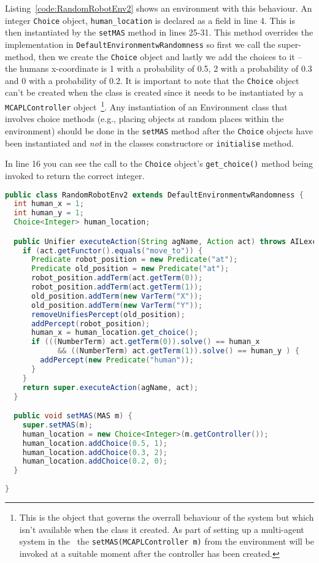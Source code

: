 \documentclass[a4]{article}
\begin{document}
Listing~\ref{code:RandomRobotEnv2} shows an environment with this behaviour.  An integer \texttt{Choice} object, \texttt{human\_location} is declared as a field in line 4.  This is then instantiated by the \texttt{setMAS} method in lines 25-31.  This method overrides the implementation in \texttt{DefaultEnvironmentwRandomness} so first we call the super-method, then we create the \texttt{Choice} object and lastly we add the choices to it -- the humans x-coordinate is 1 with a probability of 0.5, 2 with a probability of 0.3 and 0 with a probability of 0.2.  It is important to note that the \texttt{Choice} object can't be created when the class is created since it needs to be instantiated by a \texttt{MCAPLController} object~\footnote{This is the object that governs the overrall behaviour of the system but which isn't available when the class it created.  As part of setting up a multi-agent system in the \ail\ the \texttt{setMAS(MCAPLController m)} from the environment will be invoked at a suitable moment after the controller has been created.}.  Any instantiation of an Environment class that involves choice methods (e.g., placing objects at random places within the environment) should be done in the \texttt{setMAS} method after the \texttt{Choice} objects have been instantiated and \emph{not} in the classes constructore or \texttt{initialise} method.

In line 16 you can see the call to the \texttt{Choice} object's \texttt{get\_choice()} method being invoked to return the correct integer.
\begin{lstlisting}[float,caption=RandomRobotEnv2,basicstyle=\sffamily,language=Java,style=easslisting,label=code:RandomRobotEnv2]
public class RandomRobotEnv2 extends DefaultEnvironmentwRandomness {
  int human_x = 1;
  int human_y = 1;
  Choice<Integer> human_location;

  public Unifier executeAction(String agName, Action act) throws AILexception {
    if (act.getFunctor().equals("move_to")) {
      Predicate robot_position = new Predicate("at");
      Predicate old_position = new Predicate("at");
      robot_position.addTerm(act.getTerm(0));
      robot_position.addTerm(act.getTerm(1));
      old_position.addTerm(new VarTerm("X"));
      old_position.addTerm(new VarTerm("Y"));
      removeUnifiesPercept(old_position);
      addPercept(robot_position);
      human_x = human_location.get_choice();
      if (((NumberTerm) act.getTerm(0)).solve() == human_x 
            && ((NumberTerm) act.getTerm(1)).solve() == human_y ) {
        addPercept(new Predicate("human"));
      }
    }
    return super.executeAction(agName, act);
  }

  public void setMAS(MAS m) {
    super.setMAS(m);
    human_location = new Choice<Integer>(m.getController());
    human_location.addChoice(0.5, 1);
    human_location.addChoice(0.3, 2);
    human_location.addChoice(0.2, 0);
  }
	      
}
\end{lstlisting}
\end{document}
